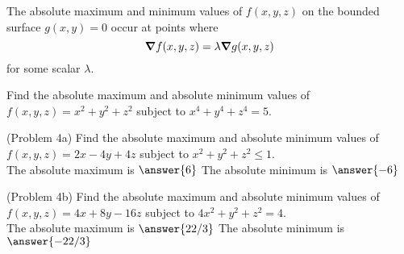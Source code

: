 \documentclass[handout]{ximera}
\begin{document}
\begin{theorem}
The absolute maximum and minimum values of $f(x,y, z)$ on the bounded surface $g(x,y) = 0$ occur at 
points where 
\[
\boldsymbol\nabla f(x,y, z) = \lambda \boldsymbol\nabla g(x,y, z)
\]
for some scalar $\lambda$.
\end{theorem}

\begin{example}[Example 4]
Find the absolute maximum and absolute minimum values of $f(x,y, z) = x^2 + y^2 + z^2$ subject to $x^4 + y^4 + z^4  = 5$.\\
\end{example}

\begin{problem}(Problem 4a)
Find the absolute maximum and absolute minimum values of $f(x,y, z) = 2x  -4y  +4z$ subject to $x^2 + y^2 + z^2 \leq 1$.\\
The absolute maximum is $\answer{6}$
The absolute minimum is $\answer{-6}$
\end{problem}

\begin{problem}(Problem 4b)
Find the absolute maximum and absolute minimum values of $f(x,y, z) = 4x + 8y - 16z$ subject to $4x^2 + y^2 + z^2 = 4$.\\
The absolute maximum is $\answer{22/3}$
The absolute minimum is $\answer{-22/3}$
\end{problem}
\end{document}
